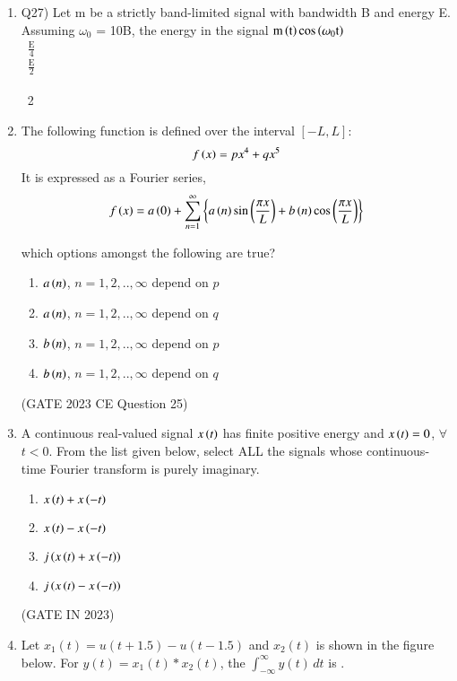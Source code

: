 \begin{enumerate}[label=\thechapter.\arabic*,ref=\thechapter.\theenumi]
 \item Q27) Let m be a strictly band-limited signal with bandwidth B and energy E. Assuming $\omega_0$ = 10B, the energy in the signal $\text{m}\left(\text{t}\right)\text{cos}\left(\omega_0\text{t}\right)$\\[1ex]
\ $\frac{\text{E}}{4}$\\[1ex]
\ $\frac{\text{E}}{2}$\\[1ex]
\ \\[1ex]
\ 2 \qquad\qquad\qquad\quad\qquad\qquad\qquad\qquad{}

\solution

\newpage

\item The following function is defined over the interval $[-L,L]:$
    $$f\left(x\right)=px^4+qx^5$$
It is expressed as a Fourier series,
    $$f\left(x\right)=a\left(0\right)+\sum_{n=1}^{\infty}\left\{a\left(n\right)\sin\left(\frac{\pi x}{L}\right)+b\left(n\right)\cos\left(\frac{\pi x}{L}\right)\right\}$$

which options amongst the following are true?
\begin{enumerate}[label=(\alph*)]
    \item $a\left(n\right)$, $n=1,2,..,\infty$ depend on $p$
    \item $a\left(n\right)$, $n=1,2,..,\infty$ depend on $q$
    \item $b\left(n\right)$, $n=1,2,..,\infty$ depend on $p$
    \item $b\left(n\right)$, $n=1,2,..,\infty$ depend on $q$
\end{enumerate}
\hfill(GATE 2023 CE Question 25)\\
\solution

\newpage
\item A continuous real-valued signal $x\left(t\right)$ has finite positive energy and $x\left(t\right) = 0$, $\forall$ $t < 0$. From the list given below, select ALL the signals whose
continuous-time Fourier transform is purely imaginary.\\
\begin{enumerate}
\item$x\left(t\right) + x\left(-t\right)$
\item$x\left(t\right) - x\left(-t\right)$
\item$j\left(x\left(t\right) + x\left(-t\right)\right)$
\item$j\left(x\left(t\right) - x\left(-t\right)\right)$
\end{enumerate}
\hfill{(GATE IN 2023)}\\
\solution

\item Let $x_1(t) = u(t + 1.5) - u(t - 1.5)$ and $x_2(t)$ is shown in the figure below. For $y(t) = x_1(t) * x_2(t)$, the $\int_{-\infty}^{\infty} y(t) \, dt$ is \underline{\hspace{2cm}}.\\


\end{enumerate}
